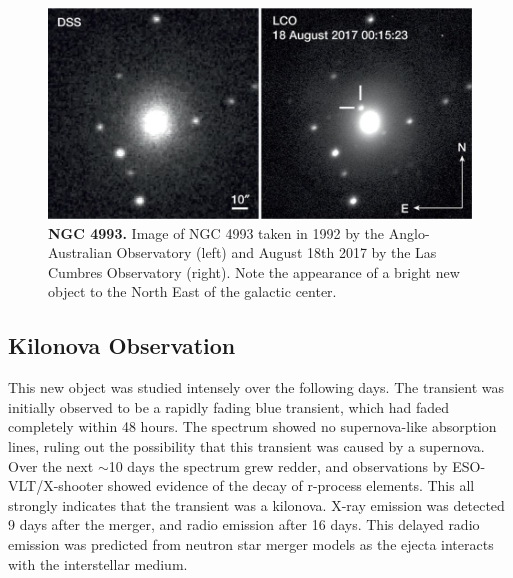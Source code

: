 \documentclass[11pt]{cuthesis}
\begin{document}
\begin{figure} %
\begin{center}
\includegraphics[width=0.8\linewidth]{NGC4993.jpg}
\end{center}
\caption{\textbf{NGC 4993.} Image of NGC 4993 taken in 1992 by the Anglo-Australian Observatory (left) and August 18th 2017 by the Las Cumbres Observatory (right). Note the appearance of a bright new object to the North East of the galactic center. \cite{Arcavi:2017xiz} }
\label{fig:NGC4993}
\end{figure}

\subsection{Kilonova Observation}
This new object was studied intensely over the following days. The transient was initially observed to be a rapidly fading blue transient, which had faded completely within 48 hours. The spectrum showed no supernova-like absorption lines, ruling out the possibility that this transient was caused by a supernova. Over the next $\sim$10 days the spectrum grew redder, and observations by ESO-VLT/X-shooter showed evidence of the decay of r-process elements. This all strongly indicates that the transient was a kilonova. X-ray emission was detected 9 days after the merger, and radio emission after 16 days. This delayed radio emission was predicted from neutron star merger models as the ejecta interacts with the interstellar medium.
\end{document}
